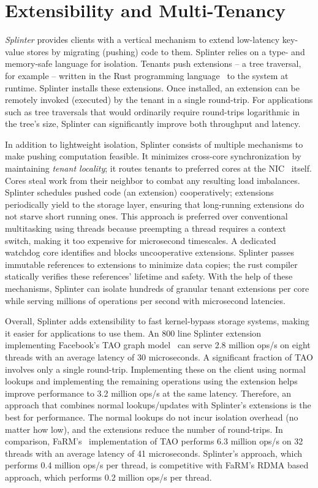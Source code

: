 \section{Extensibility and Multi-Tenancy}

\emph{Splinter} provides clients with a vertical mechanism
to extend low-latency key-value stores by migrating (pushing) code to them.
%
Splinter relies on a type- and memory-safe language for isolation.
%
Tenants push
extensions – a tree traversal, for example – written in the Rust
programming language~\cite{rust} to the system at runtime.
%
Splinter installs
these extensions.
%
Once installed, an extension can
be remotely invoked (executed) by the tenant in a
single round-trip.
%
For applications such as tree traversals that would ordinarily require
round-trips logarithmic in the tree's size, Splinter can
significantly improve both throughput and latency.

In addition to lightweight isolation, Splinter consists of multiple
mechanisms to make pushing computation feasible.
%
It minimizes cross-core synchronization
by maintaining \emph{tenant locality};
%
it routes tenants
to preferred cores at the NIC~\cite{flow-director} itself.
%
Cores
steal work from
their neighbor to combat any resulting load imbalances.
%
Splinter schedules pushed code (an extension) cooperatively; extensions
periodically yield to the storage layer, ensuring that long-running
extensions do not starve short running ones.
%
This
approach is preferred over conventional multitasking using threads
because preempting a thread requires a context switch, making it too
expensive for microsecond timescales.
%
A dedicated watchdog core identifies and blocks uncooperative
extensions.
%
Splinter passes immutable references to extensions to minimize data
copies; the rust compiler statically verifies these references' lifetime
and safety.
%
With the help of these mechanisms, Splinter can isolate
hundreds of granular tenant extensions per core while serving millions of
operations per second with microsecond latencies.

Overall, Splinter adds extensibility to fast kernel-bypass storage
systems, making it easier for applications to use them.
%
An 800 line Splinter extension implementing Facebook’s TAO graph
model~\cite{tao-2013}
can serve 2.8 million ops/s on eight threads with an average latency of
30 microseconds.
%
A significant fraction of TAO involves only a single
round-trip.
%
Implementing these on the client using normal lookups and
implementing the remaining operations using the extension helps improve
performance to 3.2 million ops/s at the same latency.
%
Therefore, an
approach that combines normal lookups/updates with Splinter’s extensions
is the best for performance.
%
The normal lookups do not incur isolation
overhead (no matter how low), and the extensions reduce the number of
round-trips.
%
In comparison, FaRM’s~\cite{farm-2014} implementation of TAO performs
6.3 million
ops/s on 32 threads with an average latency of 41 microseconds.
%
Splinter’s approach, which performs 0.4 million ops/s per thread,
is competitive with FaRM’s RDMA based approach, which performs 0.2 million
ops/s per thread.
